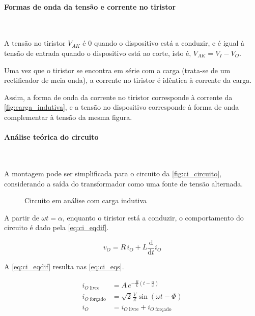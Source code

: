 \documentclass[a4paper,11pt]{article}
\numberwithin{equation}{section}
\begin{document}
\paragraph{Formas de onda da tensão e corrente no tiristor}\mbox{}\

A tensão no tiristor $V_{AK}$ é $0$ quando o dispositivo está a conduzir, e é igual à tensão de entrada quando o dispositivo está ao corte, isto é, $V_{AK} = V_I - V_O$.

Uma vez que o tiristor se encontra em série com a carga (trata-se de um rectificador de meia onda), a corrente no tiristor é idêntica à corrente da carga.

Assim, a forma de onda da corrente no tiristor corresponde à corrente da \autoref{fig:carga_indutiva}, e a tensão no dispositivo corresponde à forma de onda complementar à tensão da mesma figura.

\paragraph{Análise teórica do circuito}\mbox{}\

A montagem pode ser simplificada para o circuito da \autoref{fig:ci_circuito}, considerando a saída do transformador como uma fonte de tensão alternada.

\begin{figure}[h]
	\centering
	\caption{Circuito em análise com carga indutiva}
	\label{fig:ci_circuito}
\end{figure}

A partir de $\omega t = \alpha$, enquanto o tiristor está a conduzir, o comportamento do circuito é dado pela \autoref{eq:ci_eqdif}.

\begin{equation}
\label{eq:ci_eqdif}
v_O = R\,i_{O} + L \frac{\mathrm{d}}{\mathrm{d}t}i_O
\end{equation}

A \autoref{eq:ci_eqdif} resulta nas \autoref{eq:ci_eqs}.

\begin{subequations}
\label{eq:ci_eqs}
\begin{align}
i_{O\;\text{livre}} &= A\,e^{-\frac{R}{L}(t - \frac{\alpha}{\omega})}\\
i_{O\;\text{forçado}} &= \sqrt{2} \frac{V}{Z} \sin{(\omega t - \Phi)}\\
i_O &= i_{O\;\text{livre}} + i_{O\;\text{forçado}}
\end{align}
\end{subequations}
\end{document}
